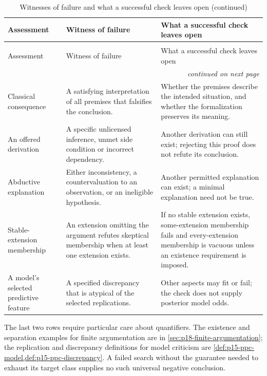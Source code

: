 \begin{longtable}{@{}p{}p{}p{}@{}}
\caption{Witnesses of failure and what a successful check leaves open}\\
\toprule
Assessment & Witness of failure & What a successful check leaves open \\
\midrule
\endfirsthead
\caption[]{Witnesses of failure and what a successful check leaves open (continued)}\\
\toprule
Assessment & Witness of failure & What a successful check leaves open \\
\midrule
\endhead
\midrule\multicolumn{3}{r}{\emph{continued on next page}}\\
\endfoot
\endlastfoot
Classical consequence & A satisfying interpretation of all premises that
falsifies the conclusion. & Whether the premises describe the intended
situation, and whether the formalization preserves its meaning. \\
An offered derivation & A specific unlicensed inference, unmet side
condition or incorrect dependency. & Another derivation can still exist;
rejecting this proof does not refute its conclusion. \\
Abductive explanation & Either inconsistency, a countervaluation to an
observation, or an ineligible hypothesis. & Another permitted explanation
can exist; a minimal explanation need not be true. \\
Stable-extension membership & An extension omitting the argument refutes
skeptical membership when at least one extension exists. & If no stable
extension exists, some-extension membership fails and every-extension
membership is vacuous unless an existence requirement is imposed. \\
A model's selected predictive feature & A specified discrepancy that is
atypical of the selected replications. & Other aspects may fit or fail;
the check does not supply posterior model odds. \\
\bottomrule
\end{longtable}

The last two rows require particular care about quantifiers. The existence
and separation examples for finite argumentation are in
\cref{sec:p18-finite-argumentation}; the replication and discrepancy
definitions for model criticism are
\cref{def:p15-ppc-model,def:p15-ppc-discrepancy}. A failed search without
the guarantee needed to exhaust its target class supplies no such universal
negative conclusion.

